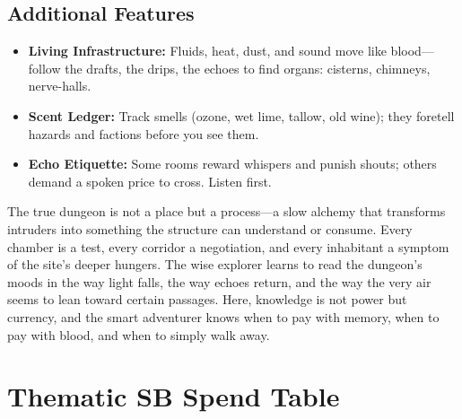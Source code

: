\subsection*{Additional Features}
\begin{itemize}
\item \textbf{Living Infrastructure:} Fluids, heat, dust, and sound move like blood---follow the drafts, the drips, the echoes to find organs: cisterns, chimneys, nerve-halls.
\item \textbf{Scent Ledger:} Track smells (ozone, wet lime, tallow, old wine); they foretell hazards and factions before you see them.
\item \textbf{Echo Etiquette:} Some rooms reward whispers and punish shouts; others demand a spoken price to cross. Listen first.
\end{itemize}

\begin{tcolorbox}[colback=black!3,colframe=black!40!white,title={Patronage \& Power}]
The true dungeon is not a place but a process---a slow alchemy that transforms intruders into something the structure can understand or consume. Every chamber is a test, every corridor a negotiation, and every inhabitant a symptom of the site's deeper hungers. The wise explorer learns to read the dungeon's moods in the way light falls, the way echoes return, and the way the very air seems to lean toward certain passages. Here, knowledge is not power but currency, and the smart adventurer knows when to pay with memory, when to pay with blood, and when to simply walk away.
\end{tcolorbox}


\section*{Thematic SB Spend Table}
\label{sec:dungeon-sb}

